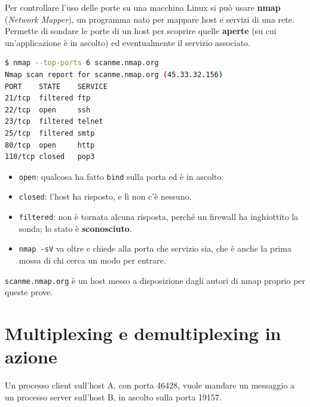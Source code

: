 Per controllare l'uso delle porte su una macchina Linux si può usare \textbf{nmap} (\emph{Network Mapper}),
un programma nato per mappare host e servizi di una rete. Permette di sondare le porte di un host per
scoprire quelle \textbf{aperte} (su cui un'applicazione è in ascolto) ed eventualmente il servizio associato.

\begin{lstlisting}[language=bash, title={Quali porte sono aperte}]
$ nmap --top-ports 6 scanme.nmap.org
Nmap scan report for scanme.nmap.org (45.33.32.156)
PORT    STATE    SERVICE
21/tcp  filtered ftp
22/tcp  open     ssh
23/tcp  filtered telnet
25/tcp  filtered smtp
80/tcp  open     http
110/tcp closed   pop3
\end{lstlisting}

\begin{itemize}
    \item \texttt{open}: qualcosa ha fatto \texttt{bind} sulla porta ed è in ascolto.
    \item \texttt{closed}: l'host ha risposto, e lì non c'è nessuno.
    \item \texttt{filtered}: non è tornata alcuna risposta, perché un firewall ha inghiottito la sonda; lo stato è
          \textbf{sconosciuto}.
    \item \texttt{nmap -sV} va oltre e chiede alla porta che servizio sia, che è anche la prima mossa di chi cerca un modo
          per entrare.
\end{itemize}
\texttt{scanme.nmap.org} è un host messo a disposizione dagli autori di nmap proprio per queste prove.

\section{Multiplexing e demultiplexing in azione}

Un processo client sull'host A, con porta 46428, vuole mandare un messaggio a un processo server sull'host B, in
ascolto sulla porta 19157.

